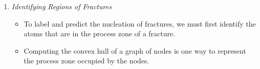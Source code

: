 \begin{enumerate}
    \item \emph{Identifying Regions of Fractures} 
        \begin{itemize}
            \item To label and predict the nucleation of fractures, we must first identify the atoms that are in the process zone of a fracture. 
            \item Computing the convex hull of a graph of nodes is one way to represent the process zone occupied by the nodes.
        \end{itemize}
\end{enumerate}









